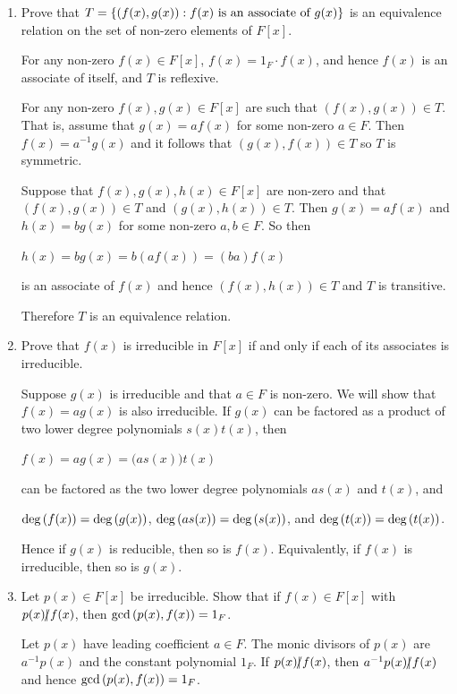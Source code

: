 \documentclass[11pt,fleqn,dvipsnames,usenames]{article}
\begin{document}
\begin{enumerate}
\item Prove that $T = \left\{(f(x),g(x)):f(x)\text{ is an associate of } g(x)\right\}$ is an equivalence relation on the set of non-zero elements of $F[x]$.
\vsmsp

\solution For any non-zero $f(x)\in F[x]$, $f(x) = 1_{F}\cdot f(x)$, and hence $f(x)$ is an associate of itself, and $T$ is reflexive.

For any non-zero $f(x),g(x)\in F[x]$ are such that $(f(x),g(x))\in T$.  That is, assume that $g(x) = af(x)$ for some non-zero $a\in F$.  Then $f(x) = a^{-1}g(x)$ and it follows that $(g(x),f(x))\in T$ so $T$ is symmetric.

Suppose that $f(x),g(x),h(x)\in F[x]$ are non-zero and that $(f(x),g(x))\in T$ and $(g(x),h(x))\in T$.  Then $g(x) = af(x)$ and $h(x) = bg(x)$ for some non-zero $a,b\in F$.  So then
\begin{center}
$h(x) = bg(x) = b(af(x)) = (ba)f(x)$
\end{center}
is an associate of $f(x)$ and hence $(f(x),h(x))\in T$ and $T$ is transitive.
\vsp

Therefore $T$ is an equivalence relation.

\item Prove that $f(x)$ is irreducible in $F[x]$ if and only if each of its associates is irreducible.
\vsmsp

\solution Suppose $g(x)$ is irreducible and that $a\in F$ is non-zero.  We will show that $f(x) = ag(x)$ is also irreducible.  If $g(x)$ can be factored as a product of two lower degree polynomials $s(x)t(x)$, then
\begin{center}
$f(x) = ag(x) = \big(as(x)\big)t(x)$
\end{center}
can be factored as the two lower degree polynomials $as(x)$ and $t(x)$, and
\begin{center}
$\text{deg}\left(f(x)\right) = \text{deg}\left(g(x)\right)$, $\text{deg}\left(as(x)\right) = \text{deg}\left(s(x)\right)$, and $\text{deg}\left(t(x)\right) = \text{deg}\left(t(x)\right)$.
\end{center}
Hence if $g(x)$ is reducible, then so is $f(x)$.  Equivalently, if $f(x)$ is irreducible, then so is $g(x)$.

\item Let $p(x)\in F[x]$ be irreducible.  Show that if $f(x)\in F[x]$ with $p(x)|\kern-0.9ex{/} f(x)$, then $\text{gcd}\left(p(x),f(x)\right) = 1_{F}$.
\vsmsp

\solution Let $p(x)$ have leading coefficient $a\in F$.  The monic divisors of $p(x)$ are $a^{-1}p(x)$ and the constant polynomial $1_{F}$.  If $p(x)|\kern-0.9ex{/} f(x)$, then $a^{-1}p(x)|\kern-0.9ex{/} f(x)$ and hence $\text{gcd}\left(p(x),f(x)\right) = 1_{F}$.


\end{enumerate}
\end{document}
